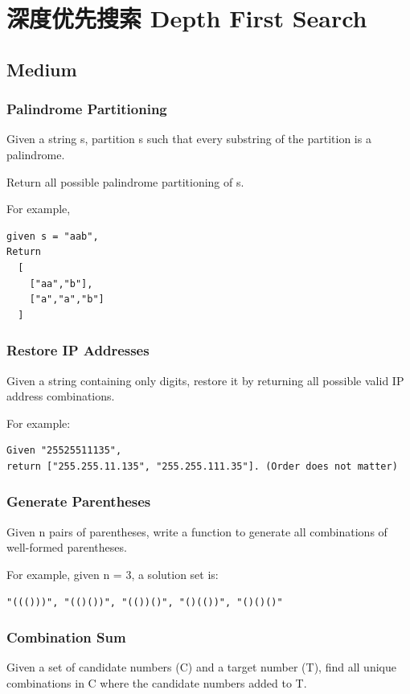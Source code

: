 \documentclass[12pt]{book}
\begin{document}
\chapter{深度优先搜索 Depth First Search}
\label{sec-11}
\section{Medium}
\label{sec-11-1}
\subsection{Palindrome Partitioning}
\label{sec-11-1-1}
Given a string s, partition s such that every substring of the partition is a palindrome.

Return all possible palindrome partitioning of s.

For example, 
\lstset{language=java,label= ,caption= ,numbers=none}
\begin{lstlisting}
given s = "aab",
Return
  [
    ["aa","b"],
    ["a","a","b"]
  ]
\end{lstlisting}
\subsection{Restore IP Addresses}
\label{sec-11-1-2}
Given a string containing only digits, restore it by returning all possible valid IP address combinations.

For example:
\lstset{language=java,label= ,caption= ,numbers=none}
\begin{lstlisting}
Given "25525511135",
return ["255.255.11.135", "255.255.111.35"]. (Order does not matter)
\end{lstlisting}
\subsection{Generate Parentheses}
\label{sec-11-1-3}
Given n pairs of parentheses, write a function to generate all combinations of well-formed parentheses.

For example, given n = 3, a solution set is:
\lstset{language=java,label= ,caption= ,numbers=none}
\begin{lstlisting}
"((()))", "(()())", "(())()", "()(())", "()()()"
\end{lstlisting}
\subsection{Combination Sum}
\label{sec-11-1-4}
Given a set of candidate numbers (C) and a target number (T), find all unique combinations in C where the candidate numbers added to T.
\end{document}
